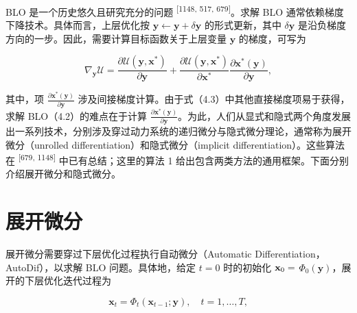 BLO 是一个历史悠久且研究充分的问题 \textsuperscript{[1148, 517, 679]}。求解 BLO 通常依赖梯度下降技术。具体而言，上层优化按 $\pmb{y} \leftarrow \pmb{y} + \delta\pmb{y}$ 的形式更新，其中 $\delta\pmb{y}$ 是沿负梯度方向的一步。因此，需要计算目标函数关于上层变量 $\pmb{y}$ 的梯度，可写为

\begin{equation}
\nabla_ {\boldsymbol {y}} \mathcal {U} = \frac {\partial \mathcal {U} (\boldsymbol {y} , \boldsymbol {x} ^ {*})}{\partial \boldsymbol {y}} + \frac {\partial \mathcal {U} (\boldsymbol {y} , \boldsymbol {x} ^ {*})}{\partial \boldsymbol {x} ^ {*}} \frac {\partial \boldsymbol {x} ^ {*} (\boldsymbol {y})}{\partial \boldsymbol {y}},\tag{4.3}
\end{equation}

其中，项 $\frac { \partial \pmb { x } ^ { * } ( \pmb { y } ) } { \partial \pmb { y } }$ 涉及间接梯度计算。由于式（4.3）中其他直接梯度项易于获得，求解 BLO（4.2）的难点在于计算 $\frac { \partial \pmb { x } ^ { * } ( \pmb { y } ) } { \partial \pmb { y } }$。为此，人们从显式和隐式两个角度发展出一系列技术，分别涉及穿过动力系统的递归微分与隐式微分理论，通常称为展开微分（unrolled differentiation）和隐式微分（implicit differentiation）。这些算法在 \textsuperscript{[679, 1148]} 中已有总结；这里的算法 1 给出包含两类方法的通用框架。下面分别介绍展开微分和隐式微分。

\section{展开微分}

展开微分需要穿过下层优化过程执行自动微分（Automatic Differentiation，AutoDif），以求解 BLO 问题。具体地，给定 $t = 0$ 时的初始化 ${ \bf { x } } _ { 0 } =$ $\Phi _ { 0 } ( \pmb { y } )$，展开的下层优化迭代过程为

\begin{equation}
\pmb {x} _ {t} = \Phi_ {t} (\pmb {x} _ {t - 1}; \pmb {y}), \quad t = 1, \dots , T,\tag{4.4}
\end{equation}

